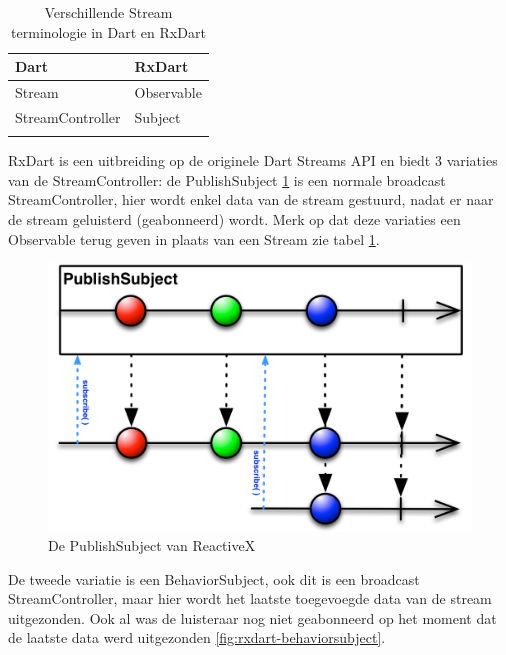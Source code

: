\begin{table}[H]
    \centering
    \begin{tabular}{ll}
        \textbf{Dart}    & \textbf{RxDart} \\ \hline
        Stream           & Observable      \\
        StreamController & Subject         \\
        &                
    \end{tabular}
    \caption{Verschillende Stream terminologie in Dart en RxDart}
    \label{table:terminologie-rxdart-dart}
\end{table}

RxDart is een uitbreiding op de originele Dart Streams API en biedt 3 variaties van de StreamController: 
de PublishSubject \ref{fig:rxdart-publishsubject} is een normale broadcast StreamController, hier wordt enkel data van de stream gestuurd, nadat er naar de stream geluisterd (geabonneerd) wordt.
Merk op dat deze variaties een Observable terug geven in plaats van een Stream zie tabel \ref{table:terminologie-rxdart-dart}.


\begin{figure}[H]
    \centering
    \includegraphics[width=\figureWidthModifier\linewidth]{img/stand-van-zaken/rxdart-publishsubject.png}
    \caption{De PublishSubject van ReactiveX \autocite{Boelens2018}}
    \label{fig:rxdart-publishsubject}
\end{figure}

De tweede variatie is een BehaviorSubject, ook dit is een broadcast StreamController, maar hier wordt het laatste toegevoegde data van de stream uitgezonden. Ook al was de luisteraar nog niet geabonneerd op het moment dat de laatste data werd uitgezonden \ref{fig:rxdart-behaviorsubject}. 

